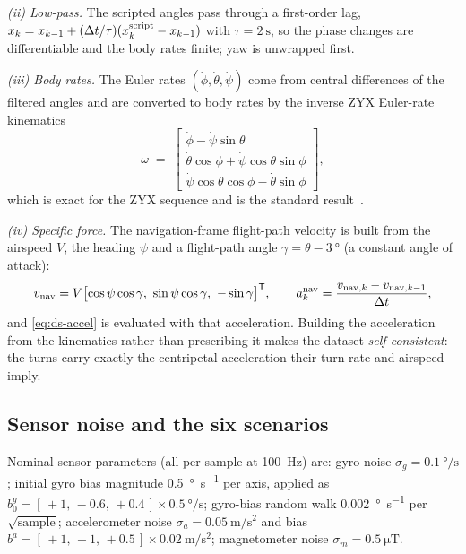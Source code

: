 \emph{(ii) Low-pass.} The scripted angles pass through a first-order lag,
$x_k = x_{k-1} + (\Delta t/\tau)(x^{\text{script}}_k - x_{k-1})$ with $\tau=\SI{2}{\second}$, so the
phase changes are differentiable and the body rates finite; yaw is unwrapped first.

\emph{(iii) Body rates.} The Euler rates $(\dot\phi,\dot\theta,\dot\psi)$ come from central
differences of the filtered angles and are converted to body rates by the inverse ZYX Euler-rate
kinematics
\begin{equation}
\omega \;=\;
\begin{bmatrix} \dot\phi - \dot\psi\sin\theta \\
 \dot\theta\cos\phi + \dot\psi\cos\theta\sin\phi \\
 \dot\psi\cos\theta\cos\phi - \dot\theta\sin\phi \end{bmatrix},
\label{eq:ds-eulerrate}
\end{equation}
which is exact for the ZYX sequence and is the standard result~\cite{stevens2015aircraft}.

\emph{(iv) Specific force.} The navigation-frame flight-path velocity is built from the airspeed
$V$, the heading $\psi$ and a flight-path angle $\gamma = \theta - \SI{3}{\degree}$ (a constant
angle of attack):
\begin{equation}
v_{\text{nav}} = V\bigl[\cos\psi\cos\gamma,\ \sin\psi\cos\gamma,\ -\sin\gamma\bigr]^\T,
\qquad a^{\text{nav}}_k = \frac{v_{\text{nav},k} - v_{\text{nav},k-1}}{\dt},
\label{eq:ds-flightpath}
\end{equation}
and \eqref{eq:ds-accel} is evaluated with that acceleration. Building the acceleration from the
kinematics rather than prescribing it makes the dataset \emph{self-consistent}: the turns carry
exactly the centripetal acceleration their turn rate and airspeed imply.

\subsection{Sensor noise and the six scenarios}

Nominal sensor parameters (all per sample at \SI{100}{\hertz}) are: gyro noise
$\sigma_g = \SI{0.1}{\degree\per\second}$; initial gyro bias magnitude
\SI{0.5}{\degree\per\second} per axis, applied as
$b^g_0 = [\,+1,\,-0.6,\,+0.4\,]\times\SI{0.5}{\degree\per\second}$; gyro-bias random walk
\SI{0.002}{\degree\per\second} per $\sqrt{\text{sample}}$; accelerometer noise
$\sigma_a = \SI{0.05}{\metre\per\second\squared}$ and bias
$b^a = [\,+1,\,-1,\,+0.5\,]\times\SI{0.02}{\metre\per\second\squared}$; magnetometer noise
$\sigma_m = \SI{0.5}{\micro\tesla}$.

